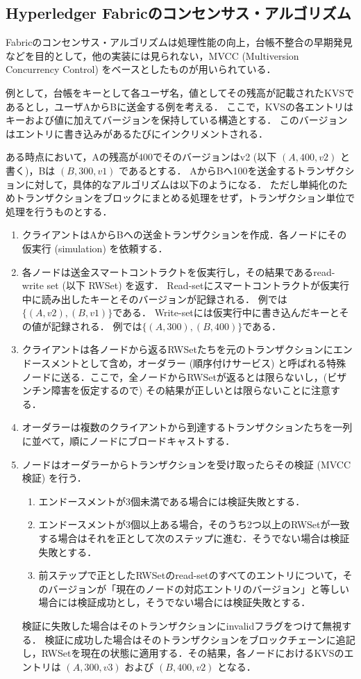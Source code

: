 \documentclass{fose2019}           %
\begin{document}
\subsection{Hyperledger Fabricのコンセンサス・アルゴリズム}
Fabricのコンセンサス・アルゴリズムは処理性能の向上，台帳不整合の早期発見などを目的として，他の実装には見られない，MVCC (Multiversion Concurrency Control) をベースとしたものが用いられている．

例として，台帳をキーとして各ユーザ名，値としてその残高が記載されたKVSであるとし，ユーザAからBに送金する例を考える．
ここで，KVSの各エントリはキーおよび値に加えてバージョンを保持している構造とする．
このバージョンはエントリに書き込みがあるたびにインクリメントされる．

ある時点において，Aの残高が400でそのバージョンはv2 (以下 $(A,400,v2)$ と書く)，Bは $(B,300,v1)$ であるとする．
AからBへ100を送金するトランザクションに対して，具体的なアルゴリズムは以下のようになる．
ただし単純化のためトランザクションをブロックにまとめる処理をせず，トランザクション単位で処理を行うものとする．

\begin{enumerate}
\item クライアントはAからBへの送金トランザクションを作成．各ノードにその仮実行 (simulation) を依頼する．
\item 各ノードは送金スマートコントラクトを仮実行し，その結果であるread-write set (以下 RWSet) を返す．
Read-setにスマートコントラクトが仮実行中に読み出したキーとそのバージョンが記録される．
例では$\{ (A, v2), (B, v1) \}$である．
Write-setには仮実行中に書き込んだキーとその値が記録される．
例では$\{ (A, 300), (B, 400) \}$である．
\item クライアントは各ノードから返るRWSetたちを元のトランザクションにエンドースメントとして含め，オーダラー (順序付けサービス) と呼ばれる特殊ノードに送る．ここで，全ノードからRWSetが返るとは限らないし，(ビザンチン障害を仮定するので) その結果が正しいとは限らないことに注意する．
\item オーダラーは複数のクライアントから到達するトランザクションたちを一列に並べて，順にノードにブロードキャストする．
\item ノードはオーダラーからトランザクションを受け取ったらその検証 (MVCC検証) を行う．
\begin{enumerate}
\item エンドースメントが3個未満である場合には検証失敗とする．
\item \label{a} エンドースメントが3個以上ある場合，そのうち2つ以上のRWSetが一致する場合はそれを正として次のステップに進む．そうでない場合は検証失敗とする．
\item 前ステップで正としたRWSetのread-setのすべてのエントリについて，そのバージョンが「現在のノードの対応エントリのバージョン」と等しい場合には検証成功とし，そうでない場合には検証失敗とする．
\end{enumerate}
検証に失敗した場合はそのトランザクションにinvalidフラグをつけて無視する．
検証に成功した場合はそのトランザクションをブロックチェーンに追記し，RWSetを現在の状態に適用する．その結果，各ノードにおけるKVSのエントリは $(A,300,v3)$ および $(B,400,v2)$ となる．
\end{enumerate}
\end{document}
